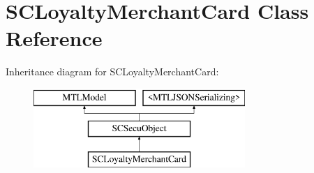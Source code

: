 \hypertarget{interface_s_c_loyalty_merchant_card}{}\section{S\+C\+Loyalty\+Merchant\+Card Class Reference}
\label{interface_s_c_loyalty_merchant_card}
Inheritance diagram for S\+C\+Loyalty\+Merchant\+Card\+:\begin{figure}[H]
\begin{center}
\leavevmode
\includegraphics[height=3.000000cm]{interface_s_c_loyalty_merchant_card}
\end{center}
\end{figure}
